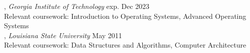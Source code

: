 
, \textit{Georgia Institute of Technology}	\hfill exp. Dec 2023 \\
Relevant coursework: Introduction to Operating Systems, Advanced Operating Systems
\\
, \textit{Louisiana State University} \hfill	May 2011 \\
Relevant coursework: Data Structures and Algorithms, Computer Architecture

